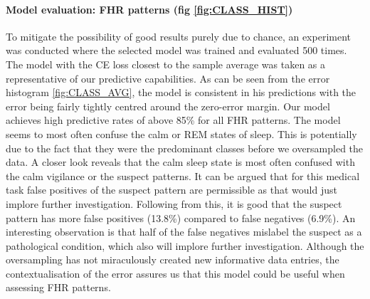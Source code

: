 \documentclass[11pt,a4paper]{article}
\begin{document}
\paragraph{Model evaluation: FHR patterns (fig \ref{fig:CLASS_HIST})}
To mitigate the possibility of good results purely due to chance, an experiment was conducted where the selected model was trained and evaluated 500 times. The model with the CE loss closest to the sample average was taken as a representative of our predictive capabilities. As can be seen from the error histogram \ref{fig:CLASS_AVG}, the model is consistent in his predictions with the error being fairly tightly centred around the zero-error margin. Our model achieves high predictive rates of above 85\% for all FHR patterns. The model seems to most often confuse the calm or REM states of sleep. This is potentially due to the fact that they were the predominant classes before we oversampled the data. A closer look reveals that the calm sleep state is most often confused with the calm vigilance or the suspect patterns. It can be argued that for this medical task false positives of the suspect pattern are permissible as that would just implore further investigation. Following from this, it is good that the suspect pattern has more false positives (13.8\%) compared to false negatives (6.9\%). An interesting observation is that half of the false negatives mislabel the suspect as a pathological condition, which also will implore further investigation. Although the oversampling has not miraculously created new informative data entries, the contextualisation of the error assures us that this model could be useful when assessing FHR patterns.
\end{document}
